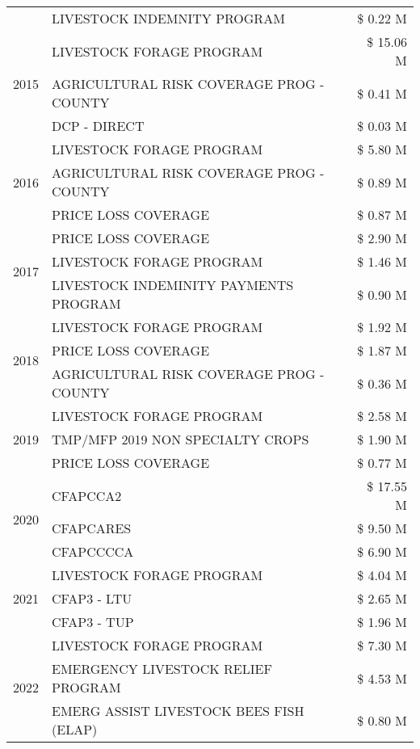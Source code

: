 \begin{tabular}{llr}
 & LIVESTOCK INDEMNITY PROGRAM & \$ 0.22 M \\
\cline{1-3}
\multirow[t]{3}{*}{2015} & LIVESTOCK FORAGE PROGRAM & \$ 15.06 M \\
 & AGRICULTURAL RISK COVERAGE PROG - COUNTY & \$ 0.41 M \\
 & DCP - DIRECT & \$ 0.03 M \\
\cline{1-3}
\multirow[t]{3}{*}{2016} & LIVESTOCK FORAGE PROGRAM & \$ 5.80 M \\
 & AGRICULTURAL RISK COVERAGE PROG - COUNTY & \$ 0.89 M \\
 & PRICE LOSS COVERAGE & \$ 0.87 M \\
\cline{1-3}
\multirow[t]{3}{*}{2017} & PRICE LOSS COVERAGE & \$ 2.90 M \\
 & LIVESTOCK FORAGE PROGRAM & \$ 1.46 M \\
 & LIVESTOCK INDEMINITY PAYMENTS PROGRAM & \$ 0.90 M \\
\cline{1-3}
\multirow[t]{3}{*}{2018} & LIVESTOCK FORAGE PROGRAM & \$ 1.92 M \\
 & PRICE LOSS COVERAGE & \$ 1.87 M \\
 & AGRICULTURAL RISK COVERAGE PROG - COUNTY & \$ 0.36 M \\
\cline{1-3}
\multirow[t]{3}{*}{2019} & LIVESTOCK FORAGE PROGRAM & \$ 2.58 M \\
 & TMP/MFP 2019 NON SPECIALTY CROPS & \$ 1.90 M \\
 & PRICE LOSS COVERAGE & \$ 0.77 M \\
\cline{1-3}
\multirow[t]{3}{*}{2020} & CFAPCCA2 & \$ 17.55 M \\
 & CFAPCARES & \$ 9.50 M \\
 & CFAPCCCCA & \$ 6.90 M \\
\cline{1-3}
\multirow[t]{3}{*}{2021} & LIVESTOCK FORAGE PROGRAM & \$ 4.04 M \\
 & CFAP3 - LTU & \$ 2.65 M \\
 & CFAP3 - TUP & \$ 1.96 M \\
\cline{1-3}
\multirow[t]{3}{*}{2022} & LIVESTOCK FORAGE PROGRAM & \$ 7.30 M \\
 & EMERGENCY LIVESTOCK RELIEF PROGRAM & \$ 4.53 M \\
 & EMERG ASSIST LIVESTOCK BEES FISH (ELAP) & \$ 0.80 M \\
\cline{1-3}
\bottomrule
\end{tabular}

